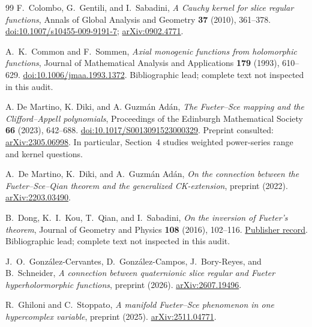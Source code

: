 \documentclass[11pt,a4paper]{article}
\numberwithin{equation}{section}
\theoremstyle{definition}
\theoremstyle{remark}
\theoremstyle{plain}
\begin{document}
\begin{thebibliography}{99}
F.~Colombo, G.~Gentili, and I.~Sabadini, \emph{A Cauchy kernel for slice regular functions}, Annals of Global Analysis and Geometry \textbf{37} (2010), 361--378. \href{https://doi.org/10.1007/s10455-009-9191-7}{doi:10.1007/s10455-009-9191-7}; \href{https://arxiv.org/abs/0902.4771}{arXiv:0902.4771}.

A.~K.~Common and F.~Sommen, \emph{Axial monogenic functions from holomorphic functions}, Journal of Mathematical Analysis and Applications \textbf{179} (1993), 610--629. \href{https://doi.org/10.1006/jmaa.1993.1372}{doi:10.1006/jmaa.1993.1372}. Bibliographic lead; complete text not inspected in this audit.

A. De Martino, K. Diki, and A. Guzm\'an Ad\'an, \emph{The Fueter--Sce mapping and the Clifford--Appell polynomials}, Proceedings of the Edinburgh Mathematical Society \textbf{66} (2023), 642--688. \href{https://doi.org/10.1017/S0013091523000329}{doi:10.1017/S0013091523000329}. Preprint consulted: \href{https://arxiv.org/abs/2305.06998}{arXiv:2305.06998}. In particular, Section~4 studies weighted power-series range and kernel questions.

A.~De Martino, K.~Diki, and A.~Guzm\'an Ad\'an, \emph{On the connection between the Fueter--Sce--Qian theorem and the generalized CK-extension}, preprint (2022). \href{https://arxiv.org/abs/2203.03490}{arXiv:2203.03490}.

B.~Dong, K.~I.~Kou, T.~Qian, and I.~Sabadini, \emph{On the inversion of Fueter's theorem}, Journal of Geometry and Physics \textbf{108} (2016), 102--116. \href{https://www.sciencedirect.com/science/article/pii/S0393044016301401}{Publisher record}. Bibliographic lead; complete text not inspected in this audit.

J.~O.~Gonz\'alez-Cervantes, D.~Gonz\'alez-Campos, J.~Bory-Reyes, and B.~Schneider, \emph{A connection between quaternionic slice regular and Fueter hyperholormorphic functions}, preprint (2026). \href{https://arxiv.org/abs/2607.19496}{arXiv:2607.19496}.

R.~Ghiloni and C.~Stoppato, \emph{A manifold Fueter--Sce phenomenon in one hypercomplex variable}, preprint (2025). \href{https://arxiv.org/abs/2511.04771}{arXiv:2511.04771}.


\end{thebibliography}
\end{document}
